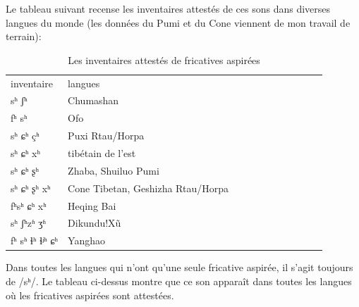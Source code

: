 \documentclass[oldfontcommands,oneside,a4paper,11pt]{memoir}
\begin{document}
Le tableau suivant recense les inventaires attestés de ces sons dans diverses langues du monde (les données du Pumi et du Cone viennent de mon travail de terrain):
\begin{table}[H]
\caption{Les inventaires attestés de fricatives aspirées} \label{tab:aspirated}
\begin{tabular}{lllllllllll}  \toprule
inventaire	&	langues	\\
sʰ ʃʰ	&	Chumashan 	\\
fʰ sʰ	&	Ofo	\\
sʰ ɕʰ çʰ	&	Puxi Rtau/Horpa	\\
sʰ ɕʰ xʰ	&	tibétain de l'est	\\
sʰ ɕʰ ʂʰ	&	Zhaba, Shuiluo Pumi	\\
sʰ ɕʰ ʂʰ xʰ	&	Cone Tibetan, Geshizha Rtau/Horpa	\\
fʰsʰ ɕʰ xʰ	&	Heqing Bai	\\
sʰ ʃʰzʱ ʒʱ	&	Dikundu!Xũ	\\
fʰ sʰ ɬʰ ɬʲʰ ɕʰ	&	Yanghao	\\
\bottomrule
\end{tabular}
\end{table}
Dans toutes les langues qui n'ont qu'une seule fricative aspirée, il s'agit toujours de /sʰ/.  Le tableau ci-dessus montre que ce son apparaît dans toutes les langues où les fricatives aspirées sont attestées.
\end{document}
